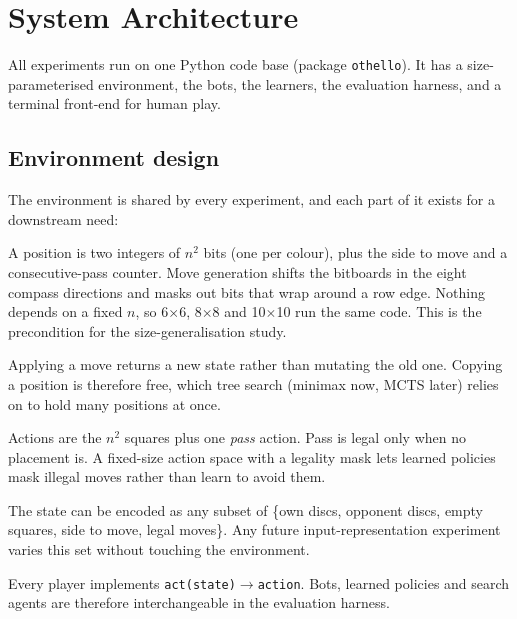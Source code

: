 \documentclass[11pt]{article}
\newcommand{\bx}[1]{#1$\times$#1}
\begin{document}
\section{System Architecture}
\label{sec:env}

All experiments run on one Python code base (package \texttt{othello}). It has
a size-parameterised environment, the bots, the learners, the evaluation
harness, and a terminal front-end for human play.

\subsection{Environment design}
\label{sec:arch}

The environment is shared by every experiment, and each part of it exists for
a downstream need:

\begin{description}[leftmargin=1.2em,style=nextline]
  \item[Bitboard state.] A position is two integers of $n^2$ bits (one per
  colour), plus the side to move and a consecutive-pass counter. Move
  generation shifts the bitboards in the eight compass directions and masks out
  bits that wrap around a row edge. Nothing depends on a fixed $n$, so \bx{6},
  \bx{8} and \bx{10} run the same code. This is the precondition for the
  size-generalisation study.
  \item[Immutable states.] Applying a move returns a new state rather than
  mutating the old one. Copying a position is therefore free, which tree
  search (minimax now, MCTS later) relies on to hold many positions at once.
  \item[Action space with an explicit pass.] Actions are the $n^2$ squares plus
  one \emph{pass} action. Pass is legal only when no placement is. A fixed-size
  action space with a legality mask lets learned policies mask illegal moves
  rather than learn to avoid them.
  \item[Configurable input planes.] The state can be encoded as any subset of
  \{own discs, opponent discs, empty squares, side to move, legal moves\}.
  Any future input-representation experiment varies this set without
  touching the environment.
  \item[One agent interface.] Every player implements
  \texttt{act(state)$\to$action}. Bots, learned policies and search agents
  are therefore interchangeable in the evaluation harness.
\end{description}
\end{document}
